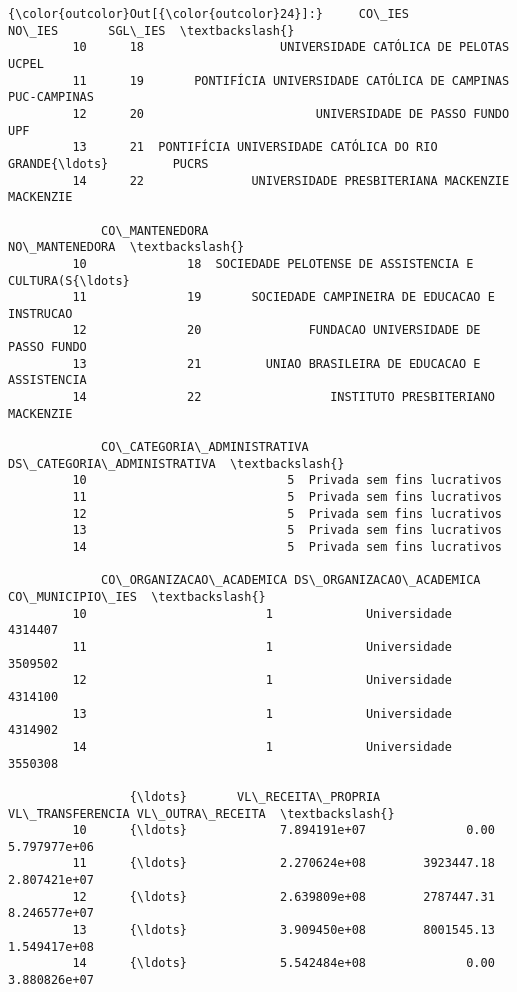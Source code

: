 \documentclass[11pt]{article}
\begin{document}
\begin{Verbatim}[commandchars=\\\{\}]
{\color{outcolor}Out[{\color{outcolor}24}]:}     CO\_IES                                             NO\_IES       SGL\_IES  \textbackslash{}
         10      18                   UNIVERSIDADE CATÓLICA DE PELOTAS         UCPEL   
         11      19       PONTIFÍCIA UNIVERSIDADE CATÓLICA DE CAMPINAS  PUC-CAMPINAS   
         12      20                        UNIVERSIDADE DE PASSO FUNDO           UPF   
         13      21  PONTIFÍCIA UNIVERSIDADE CATÓLICA DO RIO GRANDE{\ldots}         PUCRS   
         14      22               UNIVERSIDADE PRESBITERIANA MACKENZIE     MACKENZIE   
         
             CO\_MANTENEDORA                                     NO\_MANTENEDORA  \textbackslash{}
         10              18  SOCIEDADE PELOTENSE DE ASSISTENCIA E CULTURA(S{\ldots}   
         11              19       SOCIEDADE CAMPINEIRA DE EDUCACAO E INSTRUCAO   
         12              20               FUNDACAO UNIVERSIDADE DE PASSO FUNDO   
         13              21         UNIAO BRASILEIRA DE EDUCACAO E ASSISTENCIA   
         14              22                  INSTITUTO PRESBITERIANO MACKENZIE   
         
             CO\_CATEGORIA\_ADMINISTRATIVA  DS\_CATEGORIA\_ADMINISTRATIVA  \textbackslash{}
         10                            5  Privada sem fins lucrativos   
         11                            5  Privada sem fins lucrativos   
         12                            5  Privada sem fins lucrativos   
         13                            5  Privada sem fins lucrativos   
         14                            5  Privada sem fins lucrativos   
         
             CO\_ORGANIZACAO\_ACADEMICA DS\_ORGANIZACAO\_ACADEMICA  CO\_MUNICIPIO\_IES  \textbackslash{}
         10                         1             Universidade           4314407   
         11                         1             Universidade           3509502   
         12                         1             Universidade           4314100   
         13                         1             Universidade           4314902   
         14                         1             Universidade           3550308   
         
                 {\ldots}       VL\_RECEITA\_PROPRIA  VL\_TRANSFERENCIA VL\_OUTRA\_RECEITA  \textbackslash{}
         10      {\ldots}             7.894191e+07              0.00     5.797977e+06   
         11      {\ldots}             2.270624e+08        3923447.18     2.807421e+07   
         12      {\ldots}             2.639809e+08        2787447.31     8.246577e+07   
         13      {\ldots}             3.909450e+08        8001545.13     1.549417e+08   
         14      {\ldots}             5.542484e+08              0.00     3.880826e+07   
         

\end{Verbatim}
\end{document}
